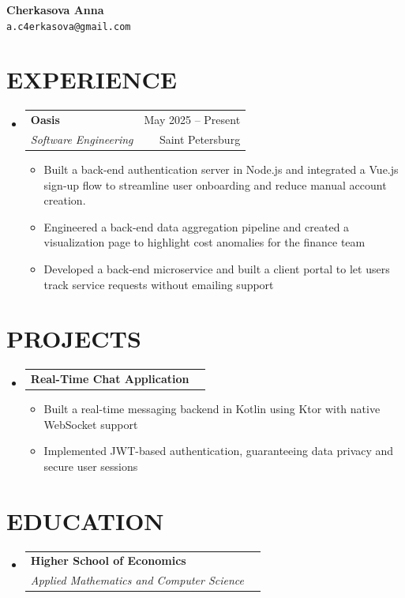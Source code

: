\documentclass[letterpaper,11pt]{article}
\makeatletter
\newcommand{\resumeItem}[1]{
  \item\small{
    {#1 \vspace{-1pt}}
  }
}
\newcommand{\resumeSubheading}[4]{
  \vspace{-1pt}\item
    \begin{tabular*}{\textwidth}[t]{l@{\extracolsep{\fill}}r}
      \textbf{#1} & {\color{dark-grey}\small #2}\vspace{1pt}\\ %
      \textit{#3} & {\color{dark-grey} \small #4}\\ %
    \end{tabular*}\vspace{-4pt}
}
\newcommand{\resumeProjectHeading}[1]{
    \item
    \begin{tabular*}{\textwidth}{l@{\extracolsep{\fill}}r}
      #1 & {\color{dark-grey}} \\
    \end{tabular*}\vspace{-4pt}
}
\newcommand{\resumeSubHeadingListStart}{\begin{itemize}[leftmargin=0in, label={}]}
\newcommand{\resumeSubHeadingListEnd}{\end{itemize}}
\newcommand{\resumeItemListStart}{\begin{itemize}}
\newcommand{\resumeItemListEnd}{\end{itemize}\vspace{0pt}}
\makeatother
\begin{document}
\begin{center}
    \textbf{\Huge Cherkasova Anna} \\ \vspace{5pt}
    \texttt{a.c4erkasova@gmail.com} \hspace{1pt} 
    \\ \vspace{-3pt}
\end{center}

\section{EXPERIENCE}
  \resumeSubHeadingListStart

    \resumeSubheading
      {Oasis}{May 2025 -- Present}
      {Software Engineering}{Saint Petersburg}
      \resumeItemListStart
        \resumeItem{Built a back‑end authentication server in Node.js and integrated a Vue.js sign‑up flow to streamline user onboarding and reduce manual account creation.}
        \resumeItem{Engineered a back‑end data aggregation pipeline and created a visualization page to highlight cost anomalies for the finance team}
        \resumeItem{Developed a back‑end microservice and built a client portal to let users track service requests without emailing support}
      \resumeItemListEnd

  \resumeSubHeadingListEnd



\section{PROJECTS}
    \resumeSubHeadingListStart
      \resumeProjectHeading
          {\textbf{Real-Time Chat Application}}
          \resumeItemListStart
            \resumeItem{Built a real-time messaging backend in Kotlin using Ktor with native WebSocket support}
            \resumeItem{Implemented JWT-based authentication, guaranteeing data privacy and secure user sessions}
          \resumeItemListEnd
          
    \resumeSubHeadingListEnd



\section {EDUCATION}
  \resumeSubHeadingListStart
    \resumeSubheading
      {Higher School of Economics }{}
      {Applied Mathematics and Computer Science}{}
  \resumeSubHeadingListEnd
\end{document}
